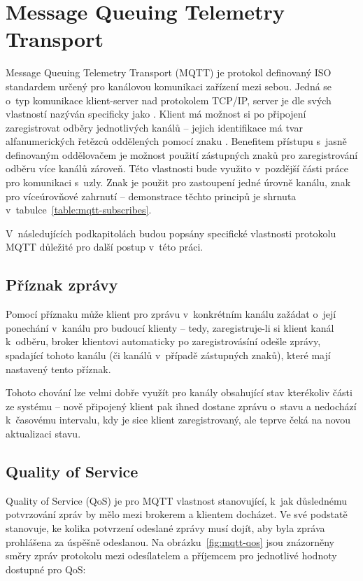 \section{Message Queuing Telemetry Transport}\label{sec:mqtt}
Message Queuing Telemetry Transport (MQTT) je protokol definovaný ISO standardem určený pro kanálovou komunikaci zařízení
mezi sebou.
Jedná se o~typ komunikace klient-server nad protokolem TCP/IP, server je dle svých vlastností nazýván
specificky jako .
Klient má možnost si po připojení zaregistrovat odběry jednotlivých kanálů -- jejich identifikace má tvar
alfanumerických řetězců oddělených pomocí znaku \ic{/}.
Benefitem přístupu s~jasně definovaným oddělovačem je možnost použití zástupných znaků pro
zaregistrování odběru více kanálů zároveň.
Této vlastnosti bude využito v~pozdější části práce pro komunikaci s~uzly.
Znak \ic{+} je použit pro zastoupení jedné úrovně kanálu, znak \ic{#} pro víceúrovňové zahrnutí -- demonstrace těchto
principů je shrnuta v~tabulce~\ref{table:mqtt-subscribes}.

V~následujících podkapitolách budou popsány specifické vlastnosti protokolu MQTT důležité pro další postup v~této
práci.

\subsection{Příznak zprávy }\label{subsec:priznak-zpravy-retain}
Pomocí příznaku  může klient pro zprávu v~konkrétním kanálu zažádat o~její ponechání v~kanálu pro budoucí
klienty -- tedy, zaregistruje-li si klient kanál k~odběru, broker klientovi automaticky po zaregistrovásíní odešle
zprávy,
spadající tohoto kanálu (či kanálů v~případě zástupných znaků), které mají nastavený tento příznak.

Tohoto chování lze velmi dobře využít pro kanály obsahující stav kterékoliv části ze systému --
nově připojený klient pak ihned dostane zprávu o~stavu a nedochází k~časovému intervalu, kdy je sice klient
zaregistrovaný, ale teprve čeká na novou aktualizaci stavu.

\subsection{Quality of Service}\label{subsec:quality-of-service}
Quality of Service (QoS) je pro MQTT vlastnost stanovující, k~jak důslednému potvrzování zpráv by mělo mezi
brokerem a klientem docházet.
Ve své podstatě stanovuje, ke kolika potvrzení odeslané zprávy musí dojít, aby byla
zpráva prohlášena za úspěšně odeslanou.
Na obrázku~\ref{fig:mqtt-qos} jsou znázorněny směry zpráv protokolu mezi odesílatelem a příjemcem pro jednotlivé
hodnoty dostupné pro QoS:

